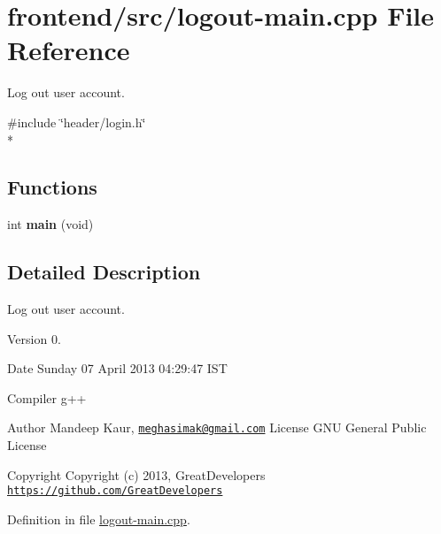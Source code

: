 \hypertarget{logout-main_8cpp}{\section{frontend/src/logout-\/main.cpp File Reference}
\label{logout-main_8cpp}
}


Log out user account.  


{\ttfamily \#include \char`\"{}header/login.\-h\char`\"{}}\\*
\subsection*{Functions}
\begin{DoxyCompactItemize}
\item 
\hypertarget{logout-main_8cpp_a840291bc02cba5474a4cb46a9b9566fe}{int {\bfseries main} (void)}\label{logout-main_8cpp_a840291bc02cba5474a4cb46a9b9566fe}

\end{DoxyCompactItemize}


\subsection{Detailed Description}
Log out user account. \begin{DoxyVersion}{Version}
0. 
\end{DoxyVersion}
\begin{DoxyDate}{Date}
Sunday 07 April 2013 04\-:29\-:47 I\-S\-T\par
 Compiler g++
\end{DoxyDate}
\begin{DoxyAuthor}{Author}
Mandeep Kaur, \href{mailto:meghasimak@gmail.com}{\tt meghasimak@gmail.\-com} License G\-N\-U General Public License 
\end{DoxyAuthor}
\begin{DoxyCopyright}{Copyright}
Copyright (c) 2013, Great\-Developers \href{https://github.com/GreatDevelopers}{\tt https\-://github.\-com/\-Great\-Developers} 
\end{DoxyCopyright}


Definition in file \hyperlink{logout-main_8cpp_source}{logout-\/main.\-cpp}.

